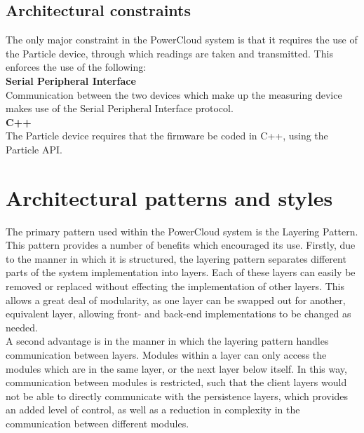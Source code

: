 \documentclass{article}
\begin{document}
	\subsection{Architectural constraints}
	
	The only major constraint in the PowerCloud system is that it 
	requires the use of the Particle device, through which readings are 
	taken and transmitted. This enforces the use of the following:\\
	
	\noindent\textbf{Serial Peripheral Interface}\\
	Communication between the two devices which make up the measuring 
	device makes use of the Serial Peripheral Interface protocol.\\
	
	\noindent\textbf{C++}\\
	The Particle device requires that the firmware be coded in C++, using 
	the Particle API.\\

\newpage

\section{Architectural patterns and styles}

The primary pattern used within the PowerCloud system is the Layering 
Pattern. This pattern provides a number of benefits which encouraged its 
use. Firstly, due to the manner in which it is structured, the layering 
pattern separates different parts of the system implementation into 
layers. Each of these layers can easily be removed or replaced without 
effecting the implementation of other layers. This allows a great deal of 
modularity, as one layer can be swapped out for another, equivalent 
layer, allowing front- and back-end implementations to be changed as 
needed.\\

A second advantage is in the manner in which the layering pattern handles 
communication between layers. Modules within a layer can only access the 
modules which are in the same layer, or the next layer below itself. In 
this way, communication between modules is restricted, such that the 
client layers would not be able to directly communicate with the 
persistence layers, which provides an added level of control, as well as 
a reduction in complexity in the communication between different 
modules.\\
\end{document}
